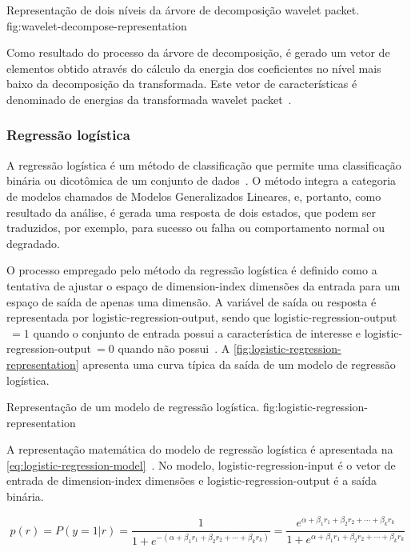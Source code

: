   {Representação de dois níveis da árvore de decomposição wavelet packet.}
  {fig:wavelet-decompose-representation}

Como resultado do processo da árvore de decomposição, é gerado um vetor de elementos obtido através
do cálculo da energia dos coeficientes no nível mais baixo da decomposição da transformada. Este
vetor de características é denominado de energias da transformada wavelet
packet~\cite{ims2007documentation}.


\subsubsection{Regressão logística}

A regressão logística é um método de classificação que permite uma classificação binária ou
dicotômica de um conjunto de dados~\cite{hosmer2013applied}. O método integra a categoria de modelos
chamados de Modelos Generalizados Lineares, e, portanto, como resultado da análise, é gerada uma
resposta de dois estados, que podem ser traduzidos, por exemplo, para sucesso ou falha ou
comportamento normal ou degradado.

O processo empregado pelo método da regressão logística é definido como a tentativa de ajustar o
espaço de \gls{dimension-index} dimensões da entrada para um espaço de saída de apenas uma dimensão.
A variável de saída ou resposta é representada por \gls{logistic-regression-output}, sendo que
\gls{logistic-regression-output}{\ensuremath{~= 1}} quando o conjunto de entrada possui a
característica de interesse e \gls{logistic-regression-output}{\ensuremath{~= 0}} quando não
possui~\cite{hosmer2013applied}. A \cref{fig:logistic-regression-representation} apresenta uma
curva típica da saída de um modelo de regressão logística.

  {Representação de um modelo de regressão logística.}
  {fig:logistic-regression-representation}

A representação matemática do modelo de regressão logística é apresentada na
\cref{eq:logistic-regression-model}~\cite{ims2007documentation}. No modelo,
\gls{logistic-regression-input} é o vetor de entrada de \gls{dimension-index} dimensões e
\gls{logistic-regression-output} é a saída binária.

\begin{equation}
  p(r) =
  P(y = 1 | r) =
  \frac{1}{1 + e^{- \left (
    \alpha + \beta_{1} r_{1} + \beta_{2} r_{2} + \cdots + \beta_{k} r_{k} \right )}} =
  \frac{e^{\alpha + \beta_{1} r_{1} + \beta_{2} r_{2} + \cdots + \beta_{k} r_{k}}}
    {1 + e^{\alpha + \beta_{1} r_{1} + \beta_{2} r_{2} + \cdots + \beta_{k} r_{k}}}
  \label{eq:logistic-regression-model}
\end{equation}

